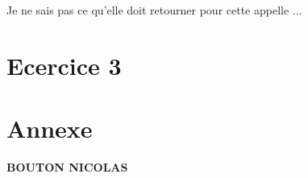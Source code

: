 \documentclass[12pt, letterpaper]{article}
\begin{document}
\begin{enumerate}
    Je ne sais pas ce qu'elle doit retourner pour cette appelle ...

\end{enumerate}

\newpage

\section*{Ecercice 3}

\newpage

\section*{Annexe}

\textbf{BOUTON NICOLAS}



\newpage


\end{document}
